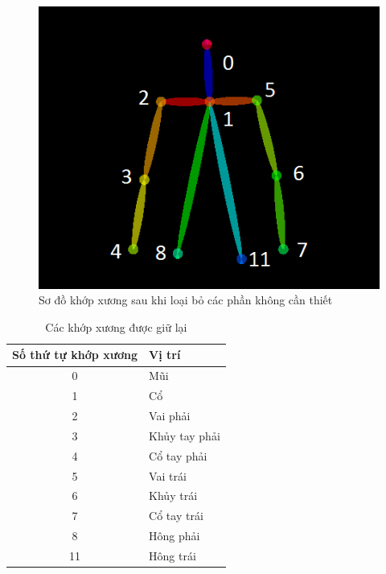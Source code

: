 \FloatBarrier
\begin{figure}[htp]
\begin{center}
\includegraphics[scale=1]{chap4/c4_figs/joints_choose.png}
\end{center}
\caption{Sơ đồ khớp xương sau khi loại bỏ các phần không cần thiết}
\label{fig:joints}
\end{figure}
\FloatBarrier

\FloatBarrier
\begin{table}[h]
\caption{Các khớp xương được giữ lại}
\label{table:joints_choose}
\centering
\begin{center}
\begin{tabular}{|c|p{9cm}|} 
 \hline
Số thứ tự khớp xương  & Vị trí \\
 \hline
 0 & Mũi\\
 \hline 
 1 & Cổ\\
 \hline 
 2 & Vai phải\\
 \hline
 3 & Khủy tay phải \\
 \hline 
 4 & Cổ tay phải\\
 \hline
 5 & Vai trái\\
 \hline
 6 & Khủy trái\\
 \hline
 7 & Cổ tay trái\\
 \hline
 8 & Hông phải\\
 \hline
 11 & Hông trái\\
 \hline
\end{tabular}
\end{center}
\end{table}
\FloatBarrier


